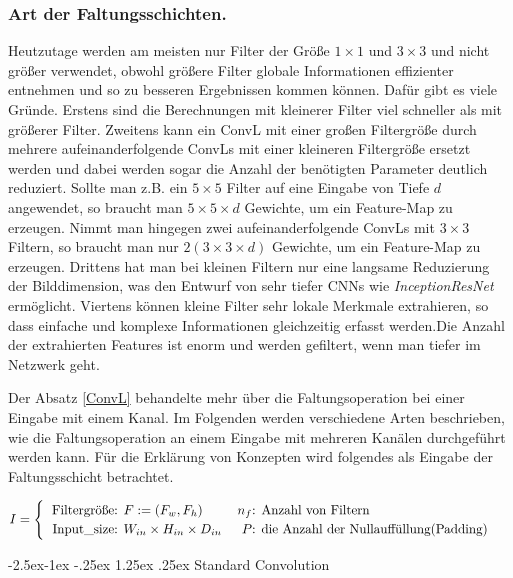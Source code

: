\documentclass[12pt,a4paper]{scrartcl}
\makeatletter
\numberwithin{equation}{section}
\renewcommand\paragraph{\@startsection{paragraph}{4}{\z@}%
	{-2.5ex\@plus -1ex \@minus -.25ex}%
	{1.25ex \@plus .25ex}%
	{\normalfont\normalsize\bfseries}}
\makeatother
\begin{document}
\subsubsection{Art der Faltungsschichten.}
Heutzutage werden am meisten nur Filter der Größe $ 1\times 1 $ und $ 3\times 3 $ und nicht größer verwendet, obwohl größere Filter globale Informationen effizienter entnehmen und so zu besseren Ergebnissen kommen können. Dafür gibt es viele Gründe. Erstens sind die Berechnungen mit kleinerer Filter viel schneller als mit größerer Filter. Zweitens kann ein \ac{ConvL} mit einer großen Filtergröße durch mehrere aufeinanderfolgende {ConvLs} mit einer kleineren Filtergröße ersetzt werden und dabei werden sogar die Anzahl der benötigten Parameter deutlich reduziert. Sollte man z.B. ein $ 5\times 5 $ Filter auf eine Eingabe von Tiefe $ d $ angewendet, so braucht man $ 5\times 5\times d $ Gewichte, um ein Feature-Map zu erzeugen. Nimmt man hingegen zwei aufeinanderfolgende {ConvLs} mit $ 3\times 3$ Filtern, so braucht man nur $ 2(3\times 3\times d) $ Gewichte, um ein Feature-Map zu erzeugen. Drittens hat man bei kleinen Filtern nur eine langsame Reduzierung der Bilddimension, was den Entwurf von sehr tiefer {CNN}s wie \textit{InceptionResNet} ermöglicht. Viertens können kleine Filter sehr lokale Merkmale extrahieren, so dass einfache und komplexe Informationen gleichzeitig erfasst werden.Die Anzahl der extrahierten Features ist enorm und werden gefiltert, wenn man tiefer im Netzwerk geht.

Der Absatz \ref{ConvL} behandelte mehr über die Faltungsoperation bei einer Eingabe mit einem Kanal. Im Folgenden werden verschiedene Arten beschrieben, wie die Faltungsoperation an einem Eingabe mit mehreren Kanälen durchgeführt werden kann. Für die Erklärung von Konzepten wird folgendes als Eingabe der Faltungsschicht betrachtet.

 \[ I=\begin{cases}

 \begin{tabular}{r@{: }l r@{: }l}
 Filtergröße& $ F:=(F_w, F_h) $  & 	$ n_{f}$& Anzahl von Filtern\\
 Input\_{size}& $ W_{in}\times H_{in}\times D_{in} $ & $ P $ & die Anzahl der Nullauffüllung(Padding)
 \end{tabular}
 
 \end{cases}\]

\paragraph{Standard Convolution}\label{CONV}
\end{document}
